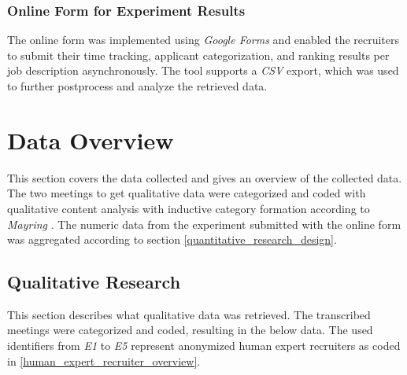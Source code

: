 \documentclass[draft,final]{thesisclass} %
\begin{document}
\subsubsection{Online Form for Experiment Results}
The online form was implemented using \textit{Google Forms} and enabled the recruiters to submit their time tracking, applicant categorization, and ranking results per job description asynchronously. The tool supports a \textit{CSV} export, which was used to further postprocess and analyze the retrieved data.

\section{Data Overview}
This section covers the data collected and gives an overview of the collected data.
The two meetings to get qualitative data were categorized and coded with qualitative content analysis with inductive category formation according to \textit{Mayring} \parencite{mayring}.
The numeric data from the experiment submitted with the online form was aggregated according to section \ref{quantitative_research_design}.

\subsection{Qualitative Research}
This section describes what qualitative data was retrieved.
The transcribed meetings were categorized and coded, resulting in the below data.
The used identifiers from \textit{E1} to \textit{E5} represent anonymized human expert recruiters as coded in \ref{human_expert_recruiter_overview}.
\end{document}
